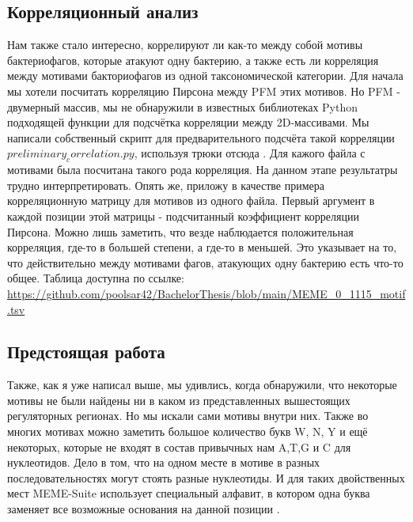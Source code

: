 \documentclass[14pt]{extarticle}
\begin{document}
    \begin{center}
        \item \subsection{Корреляционный анализ}
    \end{center}

    \par{Нам также стало интересно, коррелируют ли как-то между собой мотивы бактериофагов, которые атакуют одну 
    бактерию, а также есть ли корреляция между мотивами бакториофагов из одной таксономической категории. Для начала мы 
    хотели посчитать корреляцию Пирсона между PFM этих мотивов. Но PFM - двумерный массив, мы не обнаружили в известных 
    библиотеках Python подходящей функции для подсчётка корреляции между 2D-массивами. Мы написали собственный скрипт 
    для предварительного подсчёта такой корреляции $preliminary_correlation.py$, используя трюки отсюда 
    \cite{stackoverflow}. Для кажого файла с мотивами была посчитана такого рода корреляция. На данном этапе результатры трудно интерпретировать. Опять же, приложу в качестве примера корреляционную матрицу для мотивов из одного файла. Первый аргумент в каждой позиции этой матрицы - подсчитанный коэффициент корреляции Пирсона. Можно лишь заметить, что везде наблюдается положительная корреляция, где-то в большей степени, а где-то в меньшей. Это указывает на то, что действительно между мотивами фагов, атакующих одну бактерию есть что-то общее. Таблица доступна по ссылке: \url{https://github.com/poolsar42/BachelorThesis/blob/main/MEME_0_1115_motif.tsv}}
    
    \begin{center}
        \item \subsection{Предстоящая работа}
    \end{center}
    
    \par{Также, как я уже написал выше, мы удивлись, когда обнаружили, что некоторые мотивы не были найдены ни в каком 
    из представленных вышестоящих регуляторных регионах. Но мы искали сами мотивы внутри них. Также во многих мотивах 
    можно заметить большое количество букв W, N, Y и ещё некоторых, которые не входят в состав привычных нам A,T,G и C 
    для нуклеотидов. Дело в том, что на одном месте в мотиве в разных последовательностях могут стоять разные 
    нуклеотиды. И для таких двойственных мест MEME-Suite использует специальный алфавит, в котором одна буква заменяет 
    все возможные основания на данной позиции \cite{memealphabet}. }
    
\end{document}

